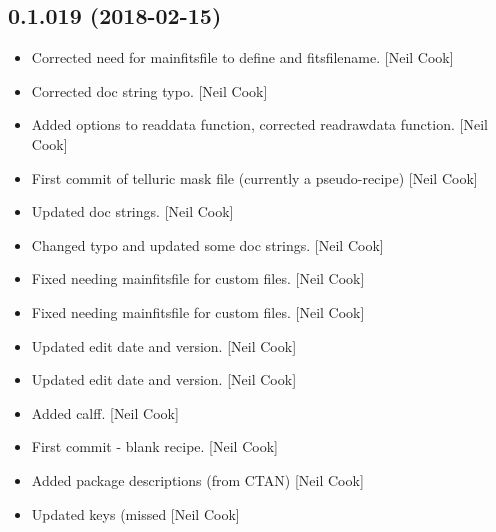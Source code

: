 \documentclass[a4paper,10pt,english]{report}
\begin{document}
\subsection{0.1.019 (2018-02-15)}
\label{\detokenize{misc/changelog:id484}}\begin{itemize}
\item {} 
Corrected need for mainfitsfile to define  and
fitsfilename. {[}Neil Cook{]}

\item {} 
Corrected doc string typo. {[}Neil Cook{]}

\item {} 
Added  options to readdata function,
corrected readrawdata function. {[}Neil Cook{]}

\item {} 
First commit of telluric mask file (currently a pseudo-recipe) {[}Neil
Cook{]}

\item {} 
Updated doc strings. {[}Neil Cook{]}

\item {} 
Changed typo and updated some doc strings. {[}Neil Cook{]}

\item {} 
Fixed needing mainfitsfile for custom files. {[}Neil Cook{]}

\item {} 
Fixed needing mainfitsfile for custom files. {[}Neil Cook{]}

\item {} 
Updated edit date and version. {[}Neil Cook{]}

\item {} 
Updated edit date and version. {[}Neil Cook{]}

\item {} 
Added calff. {[}Neil Cook{]}

\item {} 
First commit - blank  recipe. {[}Neil Cook{]}

\item {} 
Added package descriptions (from CTAN) {[}Neil Cook{]}

\item {} 
Updated keys (missed  {[}Neil Cook{]}

\end{itemize}
\end{document}
